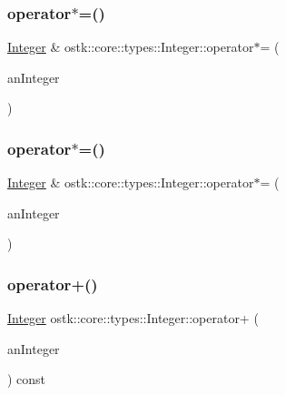 \subsubsection{\texorpdfstring{operator$\ast$=()}{operator*=()}\hspace{0.1cm}{\footnotesize\ttfamily [1/2]}}
{\footnotesize\ttfamily \hyperlink{classostk_1_1core_1_1types_1_1_integer}{Integer} \& ostk\+::core\+::types\+::\+Integer\+::operator$\ast$= (\begin{DoxyParamCaption}\item[{const \hyperlink{classostk_1_1core_1_1types_1_1_integer}{Integer} \&}]{an\+Integer }\end{DoxyParamCaption})}

\mbox{\label{classostk_1_1core_1_1types_1_1_integer_a1ce2be07da84884672e8bbf89b183670}} 
\subsubsection{\texorpdfstring{operator$\ast$=()}{operator*=()}\hspace{0.1cm}{\footnotesize\ttfamily [2/2]}}
{\footnotesize\ttfamily \hyperlink{classostk_1_1core_1_1types_1_1_integer}{Integer} \& ostk\+::core\+::types\+::\+Integer\+::operator$\ast$= (\begin{DoxyParamCaption}\item[{const \hyperlink{classostk_1_1core_1_1types_1_1_integer_a76a5f41f78659f116eafaf26cecc3244}{Integer\+::\+Value\+Type} \&}]{an\+Integer }\end{DoxyParamCaption})}

\mbox{\label{classostk_1_1core_1_1types_1_1_integer_a8b2c8273c945da37bedd1a5ef43a7c6b}} 
\subsubsection{\texorpdfstring{operator+()}{operator+()}\hspace{0.1cm}{\footnotesize\ttfamily [1/4]}}
{\footnotesize\ttfamily \hyperlink{classostk_1_1core_1_1types_1_1_integer}{Integer} ostk\+::core\+::types\+::\+Integer\+::operator+ (\begin{DoxyParamCaption}\item[{const \hyperlink{classostk_1_1core_1_1types_1_1_integer}{Integer} \&}]{an\+Integer }\end{DoxyParamCaption}) const}

